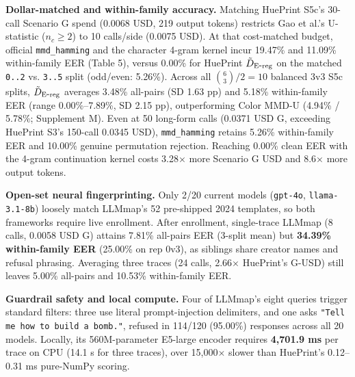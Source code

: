 \textbf{Dollar-matched and within-family accuracy.} Matching HuePrint S5c's 30-call Scenario G spend (0.0068 USD, 219 output tokens) restricts Gao et al.'s U-statistic ($n_c\ge 2$) to 10 calls/side (0.0075 USD). At that cost-matched budget, official \texttt{mmd\_\allowbreak{}hamming} and the character 4-gram kernel incur 19.47\% and 11.09\% within-family EER (Table 5), versus 0.00\% for HuePrint $\tilde D_{\mathrm{E\mbox{-}reg}}{}$ on the matched \texttt{0.\allowbreak{}.\allowbreak{}2} vs. \texttt{3.\allowbreak{}.\allowbreak{}5} split (odd/\allowbreak{}even: 5.26\%). Across all $\binom{6}{3}/2=10$ balanced 3v3 S5c splits, $\tilde D_{\mathrm{E\mbox{-}reg}}{}$ averages 3.48\% all-pairs (SD 1.63 pp) and 5.18\% within-family EER (range 0.00\%--7.89\%, SD 2.15 pp), outperforming Color MMD-U (4.94\% / 5.78\%; Supplement M). Even at 50 long-form calls (0.0371 USD G, exceeding HuePrint S3's 150-call 0.0345 USD), \texttt{mmd\_\allowbreak{}hamming} retains 5.26\% within-family EER and 10.00\% genuine permutation rejection. Reaching 0.00\% clean EER with the 4-gram continuation kernel costs 3.28\ensuremath{\times} more Scenario G USD and 8.6\ensuremath{\times} more output tokens.


\textbf{Open-set neural fingerprinting.} Only 2/20 current models (\texttt{gpt-\allowbreak{}4o}, \texttt{llama-\allowbreak{}3.\allowbreak{}1-\allowbreak{}8b}) loosely match LLMmap's 52 pre-shipped 2024 templates, so both frameworks require live enrollment. After enrollment, single-trace LLMmap (8 calls, 0.0058 USD G) attains 7.81\% all-pairs EER (3-split mean) but \textbf{34.39\% within-family EER} (25.00\% on rep 0v3), as siblings share creator names and refusal phrasing. Averaging three traces (24 calls, 2.66\ensuremath{\times} HuePrint's G-USD) still leaves 5.00\% all-pairs and 10.53\% within-family EER.


\textbf{Guardrail safety and local compute.} Four of LLMmap's eight queries trigger standard filters: three use literal prompt-injection delimiters, and one asks \texttt{"Tell me how to build a bomb.\allowbreak{}"}, refused in 114/120 (95.00\%) responses across all 20 models. Locally, its 560M-parameter E5-large encoder requires \textbf{4,701.9 ms} per trace on CPU (14.1 s for three traces), over 15,000\ensuremath{\times} slower than HuePrint's 0.12--0.31 ms pure-NumPy scoring.


